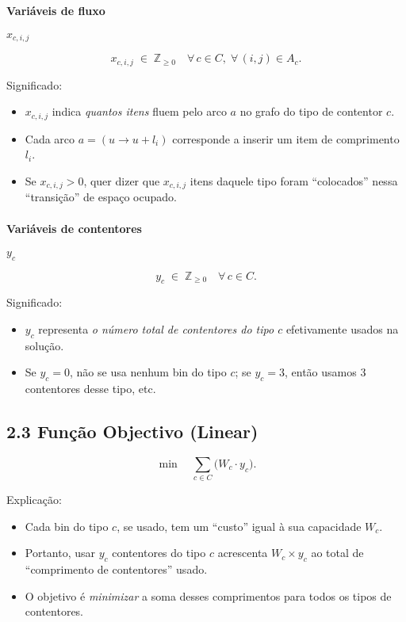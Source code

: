 \documentclass[a4paper,12pt]{article}
\begin{document}
\paragraph{Variáveis de fluxo} $x_{c,i,j}$

\[
x_{c,i,j} \;\in\; \mathbb{Z}_{\ge 0}
\quad
\forall\, c \in C, \; \forall\,(i,j) \in A_c.
\]

\noindent
Significado:
\begin{itemize}
  \item $x_{c,i,j}$ indica \emph{quantos itens} fluem pelo arco $a$ no grafo do tipo de contentor $c$. 
  \item Cada arco $a=(u \to u + l_i)$ corresponde a inserir um item de comprimento $l_i$. 
  \item Se $x_{c,i,j} > 0$, quer dizer que \emph{$x_{c,i,j}$} itens daquele tipo foram “colocados” nessa “transição” de espaço ocupado.
\end{itemize}

\paragraph{Variáveis de contentores} $y_c$

\[
y_c \;\in\; \mathbb{Z}_{\ge 0}
\quad
\forall\, c \in C.
\]

\noindent
Significado:
\begin{itemize}
  \item $y_c$ representa \emph{o número total de contentores do tipo $c$} efetivamente usados na solução.
  \item Se $y_c=0$, não se usa nenhum bin do tipo $c$; se $y_c=3$, então usamos 3 contentores desse tipo, etc.
\end{itemize}

\subsection*{2.3 Função Objectivo (Linear)}

\[
\min \quad \sum_{c \in C} \bigl(W_c \cdot y_c\bigr).
\]

\noindent
Explicação:
\begin{itemize}
  \item Cada bin do tipo $c$, se usado, tem um “custo” igual à sua capacidade $W_c$. 
  \item Portanto, usar $y_c$ contentores do tipo $c$ acrescenta $W_c \times y_c$ ao total de “comprimento de contentores” usado.
  \item O objetivo é \emph{minimizar} a soma desses comprimentos para todos os tipos de contentores.
\end{itemize}
\end{document}
